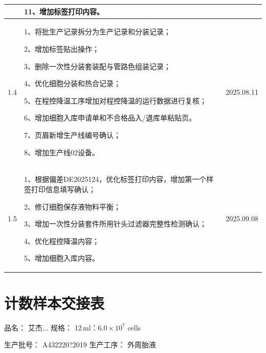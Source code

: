 \documentclass[UTF8,10pt,a4paper,fontset=fandol]{ctexart}
\newcommand{\fieldvalue}[1]{#1}
\newcommand{\handwritten}[1]{#1}
\begin{document}
\noindent
\small
\begin{tabular}{|p{1.1cm}|p{11.2cm}|p{2.4cm}|}
\hline
 & 11、增加标签打印内容。 & \\ \hline
\multirow{1}{*}{1.4} &
\begin{minipage}[t]{11.0cm}
1、将批生产记录拆分为生产记录和分装记录；

2、增加标签贴出操作；

3、删除一次性分装套装配与管路色组装记录；

4、优化细胞分装和热合记录；

5、在程控降温工序增加对程控降温的运行数据进行复核；

6、增加细胞入库申请单和不合格品入/退库单粘贴页。

7、页眉新增生产线编号确认；

8、增加生产线02设备。
\end{minipage}
&
\fieldvalue{2025.08.11}
\\ \hline
\multirow{1}{*}{1.5} &
\begin{minipage}[t]{11.0cm}
1、根据偏差DE2025124，优化标签打印内容，增加第一个样签打印信息填写确认；

2、修订细胞保存液物料平衡；

3、增加一次性分装套件所用针头过滤器完整性检测确认；

4、优化程控降温内容；

5、增加细胞入库内容。
\end{minipage}
&
\fieldvalue{\handwritten{2025.09.08}}
\\ \hline
\end{tabular}
\normalsize

\newpage

\section{计数样本交接表}

\noindent
品名：
\fieldvalue{\handwritten{艾杰...}}
\qquad
规格：
\fieldvalue{\handwritten{12\,ml：$6.0\times10^{7}$ cells}}

\noindent
生产批号：
\fieldvalue{\handwritten{A432220?2019}}
\qquad
生产工序：
\fieldvalue{\handwritten{外周胎液}}
\end{document}
